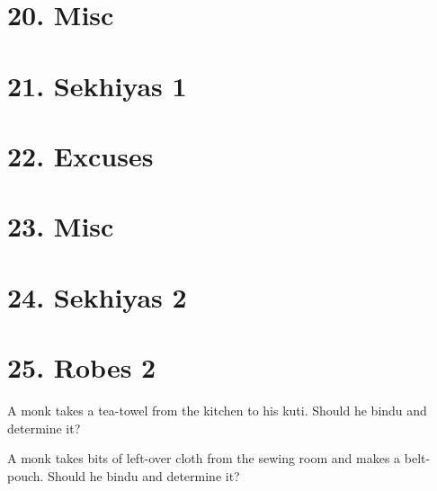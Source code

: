 \section{20. Misc}

\section{21. Sekhiyas 1}

\section{22. Excuses}

\section{23. Misc}

\section{24. Sekhiyas 2}

\section{25. Robes 2}

A monk takes a tea-towel from the kitchen to his kuti. Should he bindu
and determine it?

A monk takes bits of left-over cloth from the sewing room and makes a
belt-pouch. Should he bindu and determine it?

